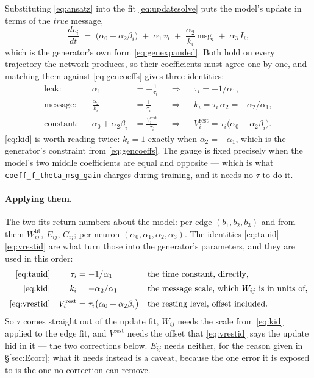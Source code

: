 \documentclass[11pt,a4paper]{article}
\newcommand{\vi}{v_i}
\newcommand{\Wij}{W_{ij}}
\newcommand{\Eij}{E_{ij}}
\newcommand{\msg}{\mathrm{msg}}
\begin{document}
Substituting \eqref{eq:ansatz} into the fit \eqref{eq:updatesolve} puts the
model's update in terms of the \emph{true} message,
%
\begin{equation}
\frac{d\vi}{dt} \;=\;
   \bigl(\alpha_0 + \alpha_2 \beta_i\bigr)
   \;+\; \alpha_1\,\vi
   \;+\; \frac{\alpha_2}{k_i}\,\msg_i
   \;+\; \alpha_3\,I_i ,
\label{eq:updateexpanded}
\end{equation}
%
which is the generator's own form \eqref{eq:genexpanded}. Both hold on every
trajectory the network produces, so their coefficients must agree one by one, and
matching them against \eqref{eq:gencoeffs} gives three identities:
%
\begin{align}
\text{leak:}    && \alpha_1 &= -\frac{1}{\tau_i}
   &&\Longrightarrow&& \tau_i = -1/\alpha_1 ,
   \label{eq:tauid}\\[2pt]
\text{message:} && \frac{\alpha_2}{k_i} &= \frac{1}{\tau_i}
   &&\Longrightarrow&& k_i = \tau_i\,\alpha_2 = -\alpha_2/\alpha_1 ,
   \label{eq:kid}\\[2pt]
\text{constant:}&& \alpha_0 + \alpha_2 \beta_i &= \frac{V^{\mathrm{rest}}_i}{\tau_i}
   &&\Longrightarrow&& V^{\mathrm{rest}}_i
        = \tau_i\bigl(\alpha_0 + \alpha_2 \beta_i\bigr) .
   \label{eq:vrestid}
\end{align}
%
\eqref{eq:kid} is worth reading twice: $k_i = 1$ exactly when
$\alpha_2 = -\alpha_1$, which is the generator's constraint from
\eqref{eq:gencoeffs}. The gauge is fixed precisely when the model's two middle
coefficients are equal and opposite --- which is what
\texttt{coeff\_f\_theta\_msg\_gain} charges during training, and it needs no
$\tau$ to do it.
%

\paragraph{Applying them.} The two fits return numbers about the model: per edge
$(b_1,b_2,b_3)$ and from them $\Wij^{\mathrm{fit}}$, $\Eij$, $C_{ij}$; per neuron
$(\alpha_0,\alpha_1,\alpha_2,\alpha_3)$. The identities
\eqref{eq:tauid}--\eqref{eq:vrestid} are what turn those into the generator's
parameters, and they are used in this order:
%
\begin{align}
\text{\eqref{eq:tauid}} && \tau_i &= -1/\alpha_1
  && \text{the time constant, directly},\\[2pt]
\text{\eqref{eq:kid}}   && k_i &= -\alpha_2/\alpha_1
  && \text{the message scale, which $\Wij$ is in units of},\\[2pt]
\text{\eqref{eq:vrestid}} && V^{\mathrm{rest}}_i
   &= \tau_i\bigl(\alpha_0 + \alpha_2 \beta_i\bigr)
  && \text{the resting level, offset included}.
\end{align}
%
So $\tau$ comes straight out of the update fit, $\Wij$ needs the scale from
\eqref{eq:kid} applied to the edge fit, and $V^{\mathrm{rest}}$ needs the offset
that \eqref{eq:vrestid} says the update hid in it --- the two corrections below.
$\Eij$ needs neither, for the reason given in \S\ref{sec:Ecorr}; what it needs
instead is a caveat, because the one error it is exposed to is the one no
correction can remove.
\end{document}

